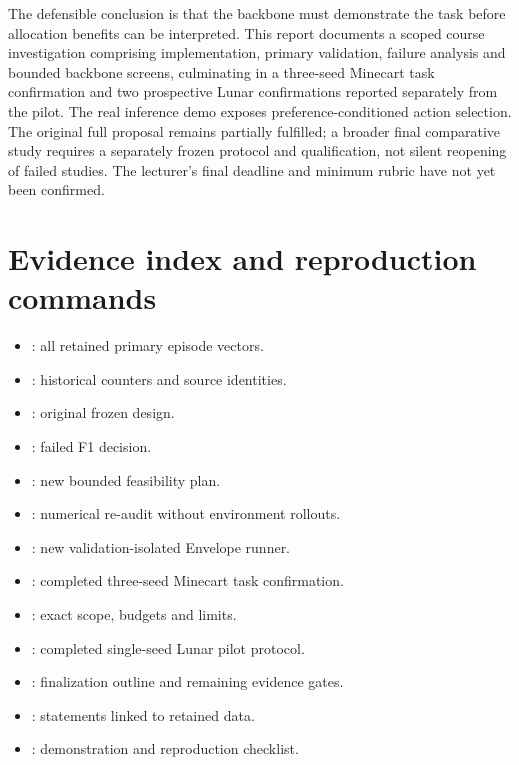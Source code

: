 The defensible conclusion is that the backbone must demonstrate the task before
allocation benefits can be interpreted. This report documents a scoped course
investigation comprising implementation, primary validation, failure analysis
and bounded backbone screens, culminating in a three-seed Minecart task confirmation
and two prospective Lunar confirmations reported separately from the pilot.
The real inference demo exposes
preference-conditioned action selection. The original full proposal remains
partially fulfilled; a broader final
comparative study requires a separately frozen protocol and qualification,
not silent reopening of failed studies. The lecturer's final deadline and
minimum rubric have not yet been confirmed.

\appendix
\section{Evidence index and reproduction commands}
\begin{itemize}
\raggedright
\item {}: all retained primary episode vectors.
\item {}: historical counters and source identities.
\item {}: original frozen design.
\item {}: failed F1 decision.
\item {}: new bounded feasibility plan.
\item {}: numerical re-audit without environment rollouts.
\item {}: new validation-isolated Envelope runner.
\item {}: completed three-seed Minecart task confirmation.
\item {}: exact scope, budgets and limits.
\item {}: completed single-seed Lunar pilot protocol.
\item {}: finalization outline and remaining evidence gates.
\item {}: statements linked to retained data.
\item {}: demonstration and reproduction checklist.
\end{itemize}
